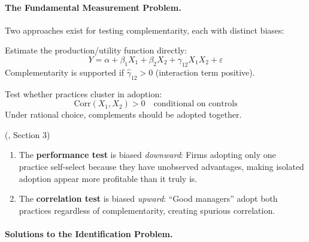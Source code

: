\paragraph{The Fundamental Measurement Problem.}

Two approaches exist for testing complementarity, each with distinct biases:

\begin{definition}
\label{def:perf-test}
Estimate the production/utility function directly:
\begin{equation}
Y = \alpha + \beta_1 X_1 + \beta_2 X_2 + \gamma_{12} X_1 X_2 + \varepsilon
\label{eq:perf-test}
\end{equation}
Complementarity is supported if $\hat{\gamma}_{12} > 0$ (interaction term positive).
\end{definition}

\begin{definition}
\label{def:corr-test}
Test whether practices cluster in adoption:
\begin{equation}
\text{Corr}(X_1, X_2) > 0 \quad \text{conditional on controls}
\label{eq:corr-test}
\end{equation}
Under rational choice, complements should be adopted together.
\end{definition}

\begin{proposition}
\label{prop:opposite-bias}
\textup{(\citet{brynjolfsson2013complementarities}, Section 3)}
\begin{enumerate}
    \item The \textbf{performance test} is biased \emph{downward}: Firms adopting 
    only one practice self-select because they have unobserved advantages, making 
    isolated adoption appear more profitable than it truly is.
    \item The \textbf{correlation test} is biased \emph{upward}: ``Good managers'' 
    adopt both practices regardless of complementarity, creating spurious correlation.
\end{enumerate}
\end{proposition}

\paragraph{Solutions to the Identification Problem.}


